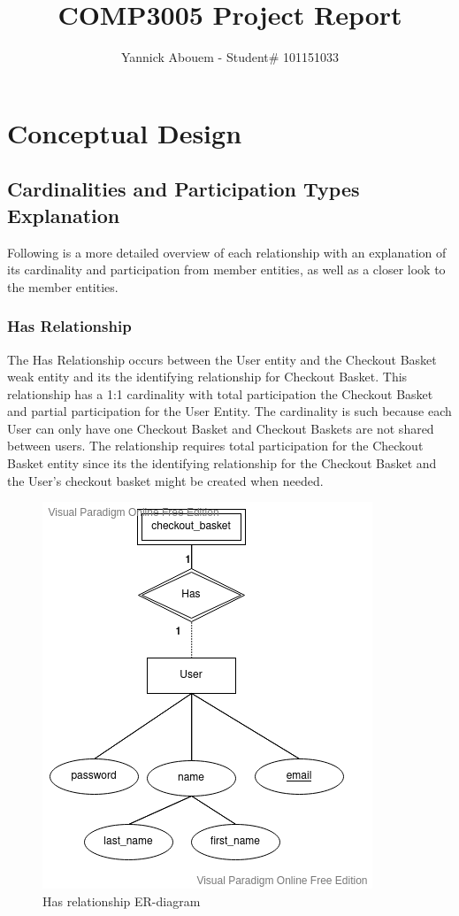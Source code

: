 \documentclass[fleqn]{scrreprt}
\title{COMP3005 Project Report}
\author{Yannick Abouem - Student\# 101151033}
\begin{document}
\maketitle

\tableofcontents

\chapter{Conceptual Design}
\section{Cardinalities and Participation Types Explanation}
Following is a more detailed overview of each relationship with an explanation
of its cardinality and participation from member entities, as well as a closer
look to the member entities.

\subsection{Has Relationship}
The Has Relationship occurs between the User entity and the Checkout Basket
weak entity and its the identifying relationship for Checkout Basket.
This relationship has a 1:1 cardinality with total participation the Checkout
Basket and partial participation for the User Entity.
The cardinality is such because each User can only have one Checkout
Basket and Checkout Baskets are not shared between users. The relationship
requires total participation for the Checkout Basket entity since its the
identifying relationship for the Checkout Basket and the User's checkout basket
might be created when needed.
\begin{figure}[h]\centering
    \includegraphics[width=.5\columnwidth]{er-diagram-project-Has.vpd.png}
    \caption{Has relationship ER-diagram}\label{fig:erh}
\end{figure}
\end{document}
